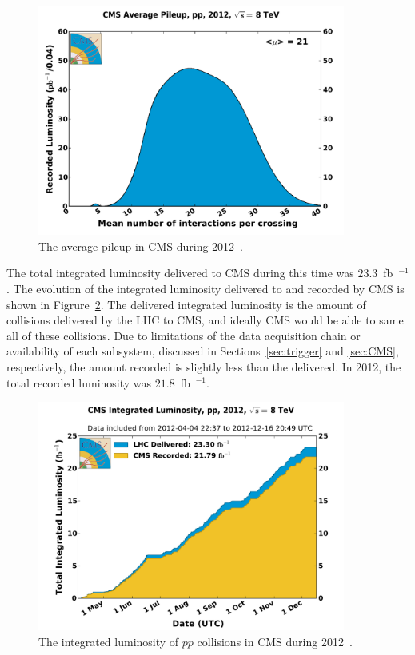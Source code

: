 \begin{figure}[ht]
 \begin{center}
    \includegraphics[width=0.90\textwidth]{figures/experiment/pileup_pp_2012.pdf}
      \end{center}
\caption{The average pileup in CMS during 2012~\cite{CMS:lumi}.}
\label{fig:pileup2012}
\end{figure}

The total integrated luminosity delivered to CMS during this time was $23.3$~fb~$^{-1}$.
The evolution of the integrated luminosity delivered to and recorded by CMS is shown in
Figrure~\ref{fig:integratedlumi2012}. The delivered integrated luminosity is the amount of
collisions delivered by the LHC to CMS, and ideally CMS would be able to same all of these collisions.
Due to limitations of the data acquisition chain or availability of each subsystem, discussed in
Sections~\ref{sec:trigger} and \ref{sec:CMS}, respectively, the amount recorded
is slightly less than the delivered. In 2012, the total recorded luminosity was $21.8$~fb~$^{-1}$.

\begin{figure}[ht]
 \begin{center}
    \includegraphics[width=0.90\textwidth]{figures/experiment/int_lumi_per_day_cumulative_pp_2012.pdf}
      \end{center}
\caption{The integrated luminosity of $pp$ collisions in CMS during 2012~\cite{CMS:lumi}.}
\label{fig:integratedlumi2012}
\end{figure}

